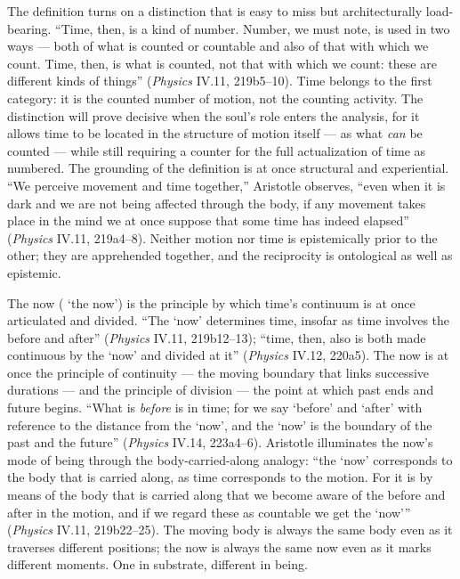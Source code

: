 The definition turns on a distinction that is easy to miss but architecturally load-bearing. ``Time, then, is a kind of number. Number, we must note, is used in two ways --- both of what is counted or countable and also of that with which we count. Time, then, is what is counted, not that with which we count: these are different kinds of things'' (\textit{Physics} IV.11, 219b5--10). Time belongs to the first category: it is the counted number of motion, not the counting activity. The distinction will prove decisive when the soul's role enters the analysis, for it allows time to be located in the structure of motion itself --- as what \textit{can} be counted --- while still requiring a counter for the full actualization of time as numbered. The grounding of the definition is at once structural and experiential. ``We perceive movement and time together,'' Aristotle observes, ``even when it is dark and we are not being affected through the body, if any movement takes place in the mind we at once suppose that some time has indeed elapsed'' (\textit{Physics} IV.11, 219a4--8). Neither motion nor time is epistemically prior to the other; they are apprehended together, and the reciprocity is ontological as well as epistemic.

The now ( `the now') is the principle by which time's continuum is at once articulated and divided. ``The `now' determines time, insofar as time involves the before and after'' (\textit{Physics} IV.11, 219b12--13); ``time, then, also is both made continuous by the `now' and divided at it'' (\textit{Physics} IV.12, 220a5). The now is at once the principle of continuity --- the moving boundary that links successive durations --- and the principle of division --- the point at which past ends and future begins. ``What is \textit{before} is in time; for we say `before' and `after' with reference to the distance from the `now', and the `now' is the boundary of the past and the future'' (\textit{Physics} IV.14, 223a4--6). Aristotle illuminates the now's mode of being through the body-carried-along analogy: ``the `now' corresponds to the body that is carried along, as time corresponds to the motion. For it is by means of the body that is carried along that we become aware of the before and after in the motion, and if we regard these as countable we get the `now''' (\textit{Physics} IV.11, 219b22--25). The moving body is always the same body even as it traverses different positions; the now is always the same now even as it marks different moments. One in substrate, different in being.

